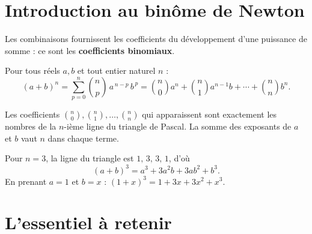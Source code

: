 \section{Introduction au binôme de Newton}

Les combinaisons fournissent les coefficients du développement d'une puissance de
somme : ce sont les \textbf{coefficients binomiaux}.

\begin{theoreme}
Pour tous réels $a,b$ et tout entier naturel $n$ :
\[ (a+b)^n=\sum_{p=0}^{n}\binom{n}{p}\,a^{\,n-p}\,b^{\,p}
   =\binom{n}{0}a^n+\binom{n}{1}a^{n-1}b+\cdots+\binom{n}{n}b^n. \]
\end{theoreme}

\begin{remarque}
Les coefficients $\binom{n}{0},\binom{n}{1},\dots,\binom{n}{n}$ qui apparaissent sont
exactement les nombres de la $n$-ième ligne du triangle de Pascal. La somme des
exposants de $a$ et $b$ vaut $n$ dans chaque terme.
\end{remarque}

\begin{exemple}
Pour $n=3$, la ligne du triangle est $1,\,3,\,3,\,1$, d'où
\[ (a+b)^3=a^3+3a^2b+3ab^2+b^3. \]
En prenant $a=1$ et $b=x$ : $(1+x)^3=1+3x+3x^2+x^3$.
\end{exemple}

\section{L'essentiel à retenir}

